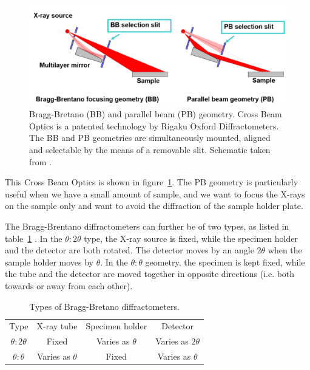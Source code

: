 	\begin{figure}
		\centering
		\includegraphics[width=\textwidth]{cross_beam_optics.png}
		\caption{\label{fig:cross_beam_optics}Bragg-Bretano (BB) and parallel beam (PB) geometry. Cross Beam Optics is a patented technology by Rigaku Oxford Diffractometers. The BB and PB geometries are simultaneously mounted, aligned and selectable by the means of a removable slit. Schematic taken from \cite{Chowdhury2022}.}
	\end{figure}
	
	This Cross Beam Optics is shown in figure~\ref{fig:cross_beam_optics}. The PB geometry is particularly useful when we have a small amount of sample, and we want to focus the X-rays on the sample only and want to avoid the diffraction of the sample holder plate.
	
	 The Bragg-Brentano diffractometers can further be of two types, as listed in table~\ref{tab:bragg_bretano}
	 . In the $\theta : 2\theta$ type, the X-ray source is fixed, while the specimen holder and the detector are both rotated. The detector moves by an angle $2\theta$ when the sample holder moves by $\theta.$ In the $\theta : \theta$ geometry, the specimen is kept fixed, while the tube and the detector are moved together in opposite directions (i.e. both towards or away from each other).
	 
	\begin{table}
	
		\centering
		
		\caption{\label{tab:bragg_bretano}Types of Bragg-Bretano diffractometers.}
		\begin{tabular}{|c|c|c|c|}
		
			\hline
			
			Type & X-ray tube & Specimen holder & Detector \\
			
			\hhline{|=|=|=|=|}
			
			$\theta : 2\theta$ & Fixed & Varies as $\theta$ & Varies as $2\theta$ \\
			
			\hline
			
			$\theta : \theta$ & Varies as $\theta$ & Fixed & Varies as $\theta$ \\
			
			\hline
		
		\end{tabular}
	\end{table}
	
